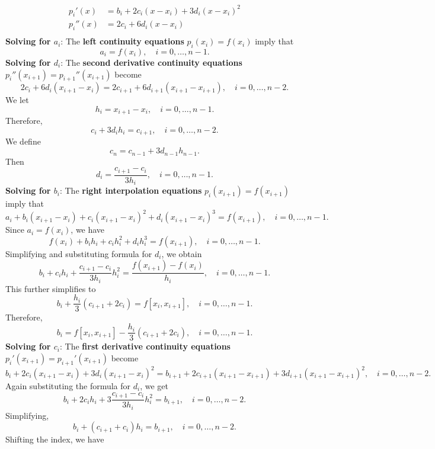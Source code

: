 \documentclass{report}
\begin{document}
\begin{itemize}
$$\begin{align}
                p_i'(x) &= b_i + 2c_i(x-x_i) + 3d_i(x-x_i)^2\\
                p_i''(x) &= 2c_i + 6d_i(x-x_i)\\
            \end{align}
            $$
            \textbf{Solving for $a_{i}$}: The \textbf{left continuity equations} $p_i(x_i) = f(x_i)$ imply that
            $$a_i = f(x_i), \quad i=0,\ldots,n-1.$$
            \bigbreak \noindent 
            \textbf{Solving for $d_{i}$}: The \textbf{second derivative continuity equations} $p_i''(x_{i+1}) = p_{i+1}''(x_{i+1})$ become
            $$2c_i + 6d_i(x_{i+1}-x_i) = 2c_{i+1} + 6d_{i+1}(x_{i+1}-x_{i+1}), \quad i=0,\ldots,n-2.$$
            We let 
            $$h_i = x_{i+1} - x_i, \quad i=0,\ldots,n-1.$$ 
            Therefore,
            $$c_i + 3d_i h_i = c_{i+1}, \quad i=0,\ldots,n-2.$$
            We define 
            $$c_n = c_{n-1} + 3d_{n-1} h_{n-1}.$$ 
            Then
            $$d_i = \displaystyle{\frac{c_{i+1} - c_i}{3 h_i}}, \quad i=0,\ldots,n-1.$$
            \bigbreak \noindent 
            \textbf{Solving for $b_{i}$}:
            The \textbf{right interpolation equations} $p_i(x_{i+1}) = f(x_{i+1})$ imply that
            $$a_i + b_i (x_{i+1}-x_i) + c_i (x_{i+1}-x_i)^2 + d_i (x_{i+1}-x_i)^3 = f(x_{i+1}), \quad i=0,\ldots,n-1.$$
            Since $a_i = f(x_i)$, we have
            $$f(x_i) + b_i h_i + c_i h_i^2 + d_i h_i^3 = f(x_{i+1}), \quad i=0,\ldots,n-1.$$
            Simplifying and substituting formula for $d_i$, we obtain
            $$b_i + c_i h_i +  \frac{c_{i+1} - c_i}{3 h_i} h_i^2 = \frac{f(x_{i+1}) - f(x_i)}{h_i}, \quad i=0,\ldots,n-1.$$
            This further simplifies to
            $$b_i + \frac{h_i}{3}(c_{i+1} + 2c_i) = f[x_i,x_{i+1}], \quad i=0,\ldots,n-1.$$
            Therefore,
            $$b_i = f[x_i,x_{i+1}] - \displaystyle{\frac{h_i}{3}}(c_{i+1} + 2c_i), \quad i=0,\ldots,n-1.$$
            \bigbreak \noindent 
            \textbf{Solving for $c_{i}$}:
            The \textbf{first derivative continuity equations} $p_i'(x_{i+1}) = p_{i+1}'(x_{i+1})$ become
            $$b_i + 2c_i(x_{i+1}-x_i) + 3d_i(x_{i+1}-x_i)^2 = b_{i+1} + 2c_{i+1}(x_{i+1}-x_{i+1}) + 3d_{i+1}(x_{i+1}-x_{i+1})^2, \quad i = 0,\ldots,n-2.$$
            Again substituting the formula for $d_i$, we get
            $$b_i + 2c_i h_i + 3\frac{c_{i+1}-c_i}{3h_i} h_i^2 = b_{i+1}, \quad i=0,\ldots,n-2.$$
            Simplifying,
            $$b_i + (c_{i+1}+c_i) h_i = b_{i+1}, \quad i=0,\ldots,n-2.$$
            \bigbreak \noindent 
            Shifting the index, we have

\end{itemize}
\end{document}
